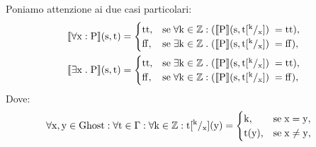 \documentclass[a4paper, 12pt, oneside,fleqn]{book}
\begin{document}
Poniamo attenzione ai due casi particolari:
\begin{align}
\llbracket\forall\mathrm{x}\mathrel{:} \mathrm{P}\rrbracket(\mathrm{s},\mathrm{t}) &=
	\begin{cases}
   		\mathrm{tt}, &\text{se}\hspace{1mm}\forall\mathrm{k}\in\mathbb{Z}\mathrel{:}(\llbracket \mathrm{P}\rrbracket(\mathrm{s},\mathrm{t}[^{\mathrm{k}}/_									{\mathrm{x}}])\hspace{1mm} = \mathrm{tt}),   \\  
   		\mathrm{ff}, &\text{se}\hspace{1mm}\exists\mathrm{k}\in\mathbb{Z}\mathrel{.}(\llbracket \mathrm{P}\rrbracket(\mathrm{s},\mathrm{t}[^{\mathrm{k}}/_									{\mathrm{x}}])\hspace{1mm} = \mathrm{ff}),
   \end{cases} \\
\llbracket \exists\mathrm{x} \mathrel{.} \mathrm{P}\rrbracket(\mathrm{s},\mathrm{t}) &= 
	\begin{cases}
   		\mathrm{tt},  &\text{se}\hspace{1mm} \exists\mathrm{k} \in \mathbb{Z}\mathrel{.}(\llbracket \mathrm{P}\rrbracket(\mathrm{s},\mathrm{t}[^{\mathrm{k}}/_									{\mathrm{x}}])\hspace{1mm} = \mathrm{tt}),   \\
   		\mathrm{ff},&\text{se}\hspace{1mm}\forall\mathrm{k} \in \mathbb{Z}\mathrel{:}(\llbracket \mathrm{P}\rrbracket(\mathrm{s},\mathrm{t}[^{\mathrm{k}}/_{\mathrm{x}}])								\hspace{1mm} = \mathrm{ff}),
   	\end{cases}
\end{align}
Dove: \\
\begin{align}
\forall\mathrm{x} ,\mathrm{y}\in\mathrm{Ghost}\mathrel{:}\forall\mathrm{t} \in \Gamma \mathrel{:} \forall\mathrm{k} \in \mathbb{Z} \mathrel{:} \mathrm{t}[^{\mathrm{k}}/_{\mathrm{x}}](\mathrm{y}) &=
	\begin{cases}
   		\mathrm{k},  &\text{se}\hspace{1mm} \mathrm{x}=\mathrm{y},   \\
   	    \mathrm{t}(\mathrm{y}),&\text{se}\hspace{1mm} \mathrm{x} \neq \mathrm{y},
	\end{cases}
\end{align}
\end{document}
